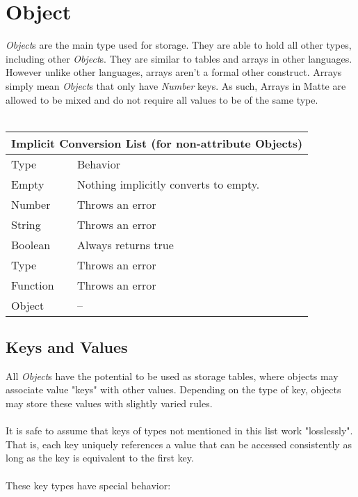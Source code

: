 \documentclass[12pt,letterpaper]{report}
\begin{document}
\section{Object}\label{Object}

\textit{Object}s are the main type used for storage. They are able to hold all other types, including 
other \textit{Object}s. They are similar to tables and arrays in other languages. However
unlike other languages, arrays aren't a formal other construct. Arrays simply mean 
\textit{Object}s that only have \textit{Number} keys. As such, Arrays in Matte are allowed to be 
mixed and do not require all values to be of the same type.
\\\\
{
\centering
\begin{tabular}{ |p{2.5cm}||p{10cm}|  }
  \hline
  \multicolumn{2}{|c|}{Implicit Conversion List (for non-attribute Objects)} \\
  \hline
  Type & Behavior\\
  \hline
  Empty & Nothing implicitly converts to empty.\\
  Number  & Throws an error \\
  String & Throws an error\\
  Boolean & Always returns true \\
  Type & Throws an error\\
  Function & Throws an error\\
  Object & --\\
 \hline
\end{tabular}
}


\subsection{Keys and Values}\label{Keys and Values}

All \textit{Object}s have the potential to be used as storage tables, where objects may associate 
value "keys" with other values. Depending on the type of key, objects may store these values 
with slightly varied rules. 
\\\\
It is safe to assume that keys of types not mentioned in this list work "losslessly". That is, 
each key uniquely references a value that can be accessed consistently as long as the 
key is equivalent to the first key.
\\\\
These key types have special behavior:
\end{document}
